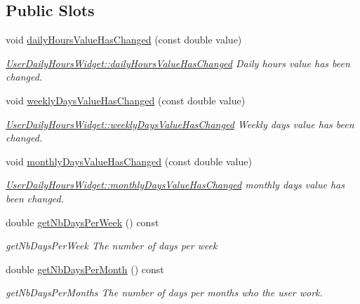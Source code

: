 \subsection*{Public Slots}
\begin{DoxyCompactItemize}
\item 
void \hyperlink{classGui_1_1Widgets_1_1UserDailyHoursWidget_a53e8b7eb038153361efd44c4061c7616}{daily\-Hours\-Value\-Has\-Changed} (const double value)
\begin{DoxyCompactList}\small\item\em \hyperlink{classGui_1_1Widgets_1_1UserDailyHoursWidget_a53e8b7eb038153361efd44c4061c7616}{User\-Daily\-Hours\-Widget\-::daily\-Hours\-Value\-Has\-Changed} Daily hours {\itshape value} has been changed. \end{DoxyCompactList}\item 
void \hyperlink{classGui_1_1Widgets_1_1UserDailyHoursWidget_a1419c5a32c0b786215b3b2b6b348be05}{weekly\-Days\-Value\-Has\-Changed} (const double value)
\begin{DoxyCompactList}\small\item\em \hyperlink{classGui_1_1Widgets_1_1UserDailyHoursWidget_a1419c5a32c0b786215b3b2b6b348be05}{User\-Daily\-Hours\-Widget\-::weekly\-Days\-Value\-Has\-Changed} Weekly days {\itshape value} has been changed. \end{DoxyCompactList}\item 
void \hyperlink{classGui_1_1Widgets_1_1UserDailyHoursWidget_a6c9cc50280109e153f3de4ef76738c85}{monthly\-Days\-Value\-Has\-Changed} (const double value)
\begin{DoxyCompactList}\small\item\em \hyperlink{classGui_1_1Widgets_1_1UserDailyHoursWidget_a6c9cc50280109e153f3de4ef76738c85}{User\-Daily\-Hours\-Widget\-::monthly\-Days\-Value\-Has\-Changed} monthly days {\itshape value} has been changed. \end{DoxyCompactList}\item 
double \hyperlink{classGui_1_1Widgets_1_1UserDailyHoursWidget_a407865d5d531c11f33f23509fae53b35}{get\-Nb\-Days\-Per\-Week} () const 
\begin{DoxyCompactList}\small\item\em get\-Nb\-Days\-Per\-Week The number of days per week \end{DoxyCompactList}\item 
double \hyperlink{classGui_1_1Widgets_1_1UserDailyHoursWidget_a621fb253d8db77007b9f80f901ba8451}{get\-Nb\-Days\-Per\-Month} () const 
\begin{DoxyCompactList}\small\item\em get\-Nb\-Days\-Per\-Months The number of days per months who the user work. \end{DoxyCompactList}\item 

\end{DoxyCompactItemize}
